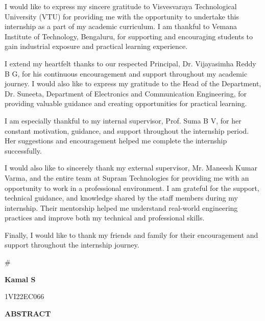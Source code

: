 \documentclass[12pt,a4paper]{report}
\begin{document}
\vspace{0.5cm}
\setlength{\parskip}{1em}
\begin{onehalfspacing}

I would like to express my sincere gratitude to Visvesvaraya Technological University (VTU) for providing me with the opportunity to undertake this internship as a part of my academic curriculum. I am thankful to Vemana Institute of Technology, Bengaluru, for supporting and encouraging students to gain industrial exposure and practical learning experience.


I extend my heartfelt thanks to our respected Principal, Dr. Vijayasimha Reddy B G, for his continuous encouragement and support throughout my academic journey. I would also like to express my gratitude to the Head of the Department, Dr. Suneeta, Department of Electronics and Communication Engineering, for providing valuable guidance and creating opportunities for practical learning.


I am especially thankful to my internal supervisor, Prof. Suma B V, for her constant motivation, guidance, and support throughout the internship period. Her suggestions and encouragement helped me complete the internship successfully.


I would also like to sincerely thank my external supervisor, Mr. Maneesh Kumar Varma, and the entire team at Supram Technologies for providing me with an opportunity to work in a professional environment. I am grateful for the support, technical guidance, and knowledge shared by the staff members during my internship. Their mentorship helped me understand real-world engineering practices and improve both my technical and professional skills.


Finally, I would like to thank my friends and family for their encouragement and support throughout the internship journey.


\#

\end{onehalfspacing}
\setlength{\parskip}{0.4em}

\vspace{1cm}
\begin{flushright}
\textbf{Kamal S}\par
1VI22EC066\par
\end{flushright}

\newpage
\begin{center}
{\LARGE \textbf{ABSTRACT}\par}
\end{center}
\end{document}
